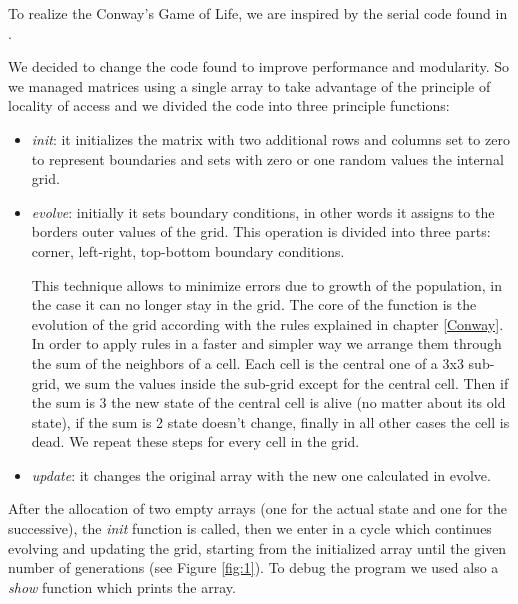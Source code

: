 \documentclass[a4paper,11pt,twoside]{report}
\begin{document}
\noindent To realize the Conway's Game of Life, we are inspired by the serial code found in \cite{code}.

\noindent We decided to change the code found to improve performance and modularity.
So we managed matrices using a single array to take advantage of the principle of locality of access and we divided the code into three principle functions:

\begin{itemize}
	\item \emph{init}: it initializes the matrix with two additional rows and columns set to zero to represent boundaries and sets with zero or one random values the internal grid.

	\item \emph{evolve}: initially it sets boundary conditions, in other words it assigns to the borders outer values of the grid. This operation is divided into three parts: corner, left-right, top-bottom boundary conditions.

	\noindent This technique allows to minimize errors due to growth of the population, in the case it can no longer stay in the grid. The core of the function is the evolution of the grid according with the rules explained in chapter \ref{Conway}. In order to apply rules in a faster and simpler way we arrange them through the sum of the neighbors of a cell. Each cell is the central one of a 3x3
sub-grid, we sum the values inside the sub-grid except for the central cell. Then if the sum is 3 the new state of the central cell is alive (no matter about its old state), if the sum is 2 state
doesn't change, finally in all other cases the cell is dead. We repeat these steps for every cell in the grid.

	\item \emph{update}: it changes the original array with the new one calculated in evolve.



\end{itemize}

\noindent After the allocation of two empty arrays (one for the actual state and one for the successive), the \emph{init} function is called, then we enter in a cycle which continues evolving and updating the grid, starting from the initialized array until the given number of generations (see Figure \ref{fig:1}).
To debug the program we used also a \emph{show} function which prints the array.
\end{document}
